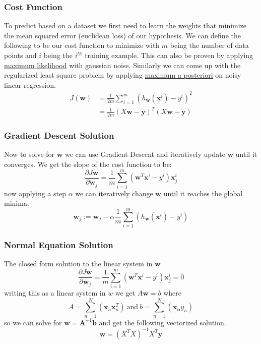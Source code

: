\documentclass[12pt]{article}
\begin{document}
    \subsubsection{Cost Function}
        To predict based on a dataset we first need to learn the weights that minimize the mean squared error (euclidean loss) of our hypothesis. We can define the following to be our cost function to
        minimize with $m$ being the number of data points and $i$ being the $i^{th}$ training example. This can also be proven by applying \hyperlink{Maximum Likelihood}{maximum likelihood} with
        gaussian noise. Similarly we can come up with the regularized least square problem by applying \hyperlink{Maximum a Posteriori}{maximum a posteriori} on noisy linear regression.
        \begin{align*}
            J(\boldsymbol{w}) &= \frac{1}{2m}\sum_{i=1}^{m}(h_{\boldsymbol{w}}(\boldsymbol{x}^i) - y^i)^2 \\
            &= \frac{1}{2m}(X\boldsymbol{w} - \boldsymbol{y})^T(X\boldsymbol{w} - \boldsymbol{y})
        \end{align*}


    \subsubsection{Gradient Descent Solution}
        Now to solve for $\boldsymbol{w}$ we can use Gradient Descent and iteratively update $\boldsymbol{w}$ until it converges. We get the slope of the cost function to be:
        $$ \frac{\partial J{\boldsymbol{w}}}{\partial \boldsymbol{w}_j} = \frac{1}{m}\sum_{i=1}^m(\boldsymbol{w}^T\boldsymbol{x}^{i}-y^{i})\boldsymbol{x}_{j}^i $$
        now applying a step $\alpha$ we can iteratively change $\boldsymbol{w}$ until it reaches the global minima. 
        $$ \boldsymbol{w}_j := \boldsymbol{w}_j - \alpha \frac{1}{m}\sum_{i=1}^{m}(h_{\boldsymbol{w}}(\boldsymbol{x}^i) - y^i) $$

    \subsubsection{Normal Equation Solution}
        The closed form solution to the linear system in $\boldsymbol{w}$
        $$ \frac{\partial J{\boldsymbol{w}}}{\partial \boldsymbol{w}_j} = \frac{1}{m}\sum_{i=1}^m(\boldsymbol{w}^T\boldsymbol{x}^{i}-y^{i})\boldsymbol{x}_{j}^i = 0 $$
        writing this as a linear system in $w$ we get $A\boldsymbol{w} = b$ where
        $$ A = \sum_{n=1}^N(\boldsymbol{x}_n \boldsymbol{x}_n^T) \ \textrm{and} \ b = \sum_{n=1}^N(\boldsymbol{x_n} y_n) $$
        so we can solve for $\boldsymbol{w} = \boldsymbol{A}^{-1}\boldsymbol{b}$ and get the following vectorized solution.
        $$ \boldsymbol{w} = (X^TX)^{-1}X^T\boldsymbol{y} $$
    
\end{document}
